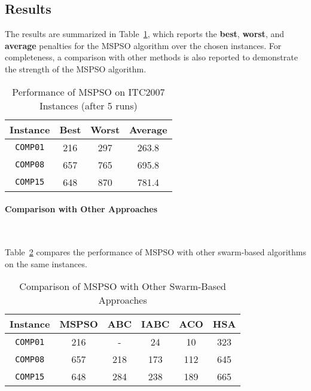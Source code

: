 \subsection{Results}
The results are summarized in Table~\ref{table:initial_results}, which reports the \textbf{best}, \textbf{worst}, and \textbf{average} penalties for the MSPSO algorithm over the chosen instances. For completeness, a comparison with other methods is also reported to demonstrate the strength of the MSPSO algorithm.

\begin{table}[H]
\centering
\caption{Performance of MSPSO on ITC2007 Instances (after 5 runs)}
\label{table:initial_results}
\begin{tabular}{|c|c|c|c|}
\hline
\textbf{Instance} & \textbf{Best} & \textbf{Worst} & \textbf{Average} \\ \hline
\texttt{COMP01}   & 216           & 297            & 263.8            \\ \hline
\texttt{COMP08}   & 657           & 765            & 695.8            \\ \hline
\texttt{COMP15}   & 648           & 870            & 781.4            \\ \hline
\end{tabular}
\end{table}

\paragraph{Comparison with Other Approaches}\

Table~\ref{table:comparison_results} compares the performance of MSPSO with other swarm-based algorithms on the same instances.

\begin{table}[H]
\centering
\caption{Comparison of MSPSO with Other Swarm-Based Approaches}
\label{table:comparison_results}
\begin{tabular}{|c|c|c|c|c|c|}
\hline
\textbf{Instance} & \textbf{MSPSO} & \textbf{ABC} & \textbf{IABC} & \textbf{ACO} & \textbf{HSA} \\ \hline
\texttt{COMP01}   & 216            & -            & 24            & 10           & 323          \\ \hline
\texttt{COMP08}   & 657            & 218          & 173           & 112          & 645          \\ \hline
\texttt{COMP15}   & 648            & 284          & 238           & 189          & 665          \\ \hline
\end{tabular}
\end{table}

